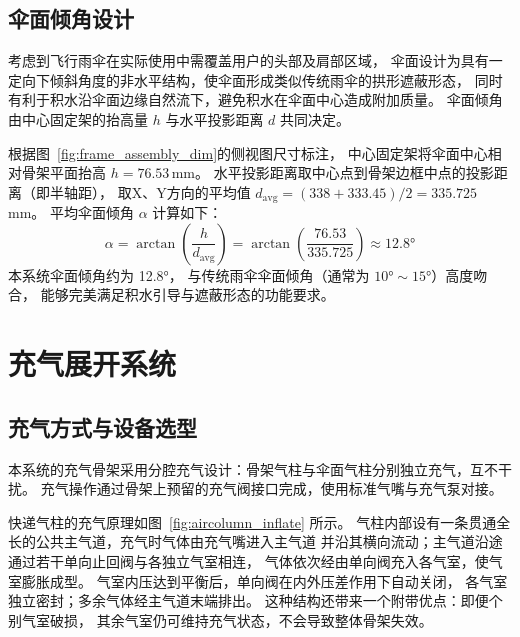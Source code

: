 \subsection{伞面倾角设计}
考虑到飞行雨伞在实际使用中需覆盖用户的头部及肩部区域，
伞面设计为具有一定向下倾斜角度的非水平结构，使伞面形成类似传统雨伞的拱形遮蔽形态，
同时有利于积水沿伞面边缘自然流下，避免积水在伞面中心造成附加质量。
伞面倾角由中心固定架的抬高量 $h$ 与水平投影距离 $d$ 共同决定。

根据图~\ref{fig:frame_assembly_dim}的侧视图尺寸标注，
中心固定架将伞面中心相对骨架平面抬高 $h = 76.53$\,mm。
水平投影距离取中心点到骨架边框中点的投影距离（即半轴距），
取X、Y方向的平均值 $d_{\text{avg}} = (338 + 333.45)/2 = 335.725$\,mm。
平均伞面倾角 $\alpha$ 计算如下：
\begin{equation}
    \alpha = \arctan\!\left(\frac{h}{d_{\text{avg}}}\right)
           = \arctan\!\left(\frac{76.53}{335.725}\right)
           \approx 12.8°
    \label{eq:tilt_angle}
\end{equation}
本系统伞面倾角约为 12.8°，
与传统雨伞伞面倾角（通常为 $10°\sim15°$）高度吻合，
能够完美满足积水引导与遮蔽形态的功能要求。




\section{充气展开系统}

\subsection{充气方式与设备选型}
本系统的充气骨架采用分腔充气设计：骨架气柱与伞面气柱分别独立充气，互不干扰。
充气操作通过骨架上预留的充气阀接口完成，使用标准气嘴与充气泵对接。

快递气柱的充气原理如图~\ref{fig:aircolumn_inflate} 所示。
气柱内部设有一条贯通全长的公共主气道，充气时气体由充气嘴进入主气道
并沿其横向流动；主气道沿途通过若干单向止回阀与各独立气室相连，
气体依次经由单向阀充入各气室，使气室膨胀成型。
气室内压达到平衡后，单向阀在内外压差作用下自动关闭，
各气室独立密封；多余气体经主气道末端排出。
这种结构还带来一个附带优点：即便个别气室破损，
其余气室仍可维持充气状态，不会导致整体骨架失效。

